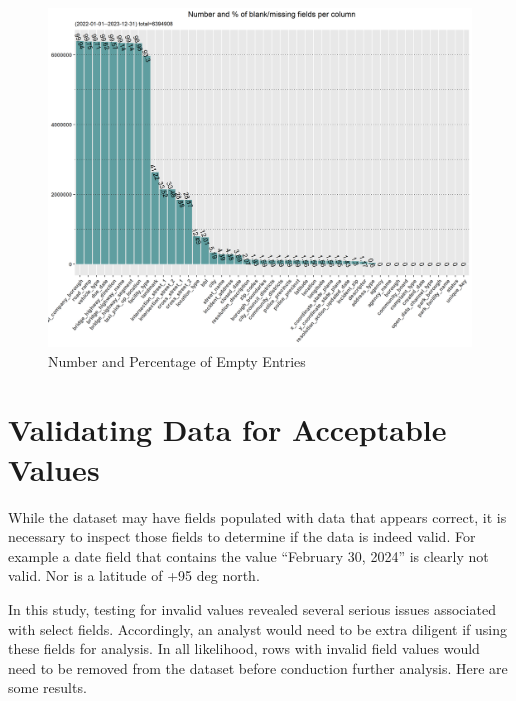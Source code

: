 \documentclass[12pt, titlepage]{article}
\begin{document}
\begin{figure}[H]
  \centering
	  \includegraphics[width=\textwidth]{BlankFields.png}
	  \caption{Number and Percentage of Empty Entries}
	  \label{fig:blank_fields}
\end{figure}



 \section{Validating Data for Acceptable Values}\label{sec:domain}
 While the dataset may have fields populated with data that appears correct, it is necessary to inspect those fields to determine if the data is indeed valid. 
 For example a date field that contains the value ``February 30, 2024'' is clearly not valid. Nor is a latitude of +95 deg north. 
 
 In this study, testing for invalid values revealed several serious issues associated with select fields. Accordingly, an analyst would need to be
extra diligent if using these fields for analysis. In all likelihood, rows with invalid field values would  need to be removed from the
dataset before conduction further analysis. Here are some results.
\end{document}
